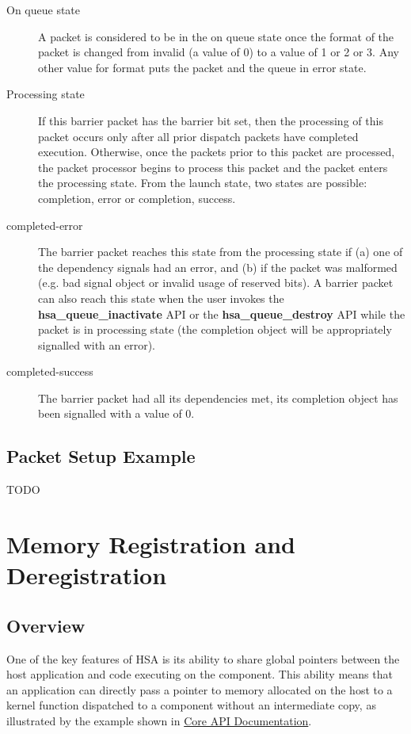 \documentclass{book}
\newcommand{\reffun}[1]{\textbf{#1}}
\begin{document}
\begin{description}
\item[On queue state] A packet is considered to be in the on queue
state once the format of the packet is changed from invalid (a value
of 0) to a value of 1 or 2 or 3. Any other value for format puts the
packet and the queue in error state.
\item[Processing state] If this barrier packet has the barrier bit set,
then the processing of this packet occurs only after all prior
dispatch packets have completed execution.  Otherwise, once the
packets prior to this packet are processed, the packet processor
begins to process this packet and the packet enters the processing
state.  From the launch state, two states are possible: completion,
error or completion, success.
\item[completed-error] The barrier packet reaches this state from
the processing state if (a) one of the dependency signals had an
error, and (b) if the packet was malformed (e.g. bad signal object
or invalid usage of reserved bits). A barrier packet can also reach
this state when the user invokes the \reffun{hsa\_queue\_inactivate}
API or the \reffun{hsa\_queue\_destroy} API while the packet is in
processing state (the completion object will be appropriately
signalled with an error).
\item[completed-success] The barrier packet had all its dependencies
met, its completion object has been signalled with a value of 0.
\end{description}
\hypertarget{aql_example}{}\subsection{Packet Setup
Example}\label{aql_example}
TODO
\hypertarget{coreapi_memory_registration}{}\section{Memory Registration and Deregistration}\label{coreapi_memory_registration}

\hypertarget{coreapi_registration_overview}{}\subsection{Overview}\label{coreapi_registration_overview}
One of the key features of HSA is its ability to share global
pointers between the host application and code executing on the
component. This ability means that an application can directly pass a
pointer to memory allocated on the host to a kernel function
dispatched to a component without an intermediate copy, as illustrated
by the example shown in \hyperlink{coreapi}{Core API
Documentation}.
\end{document}
